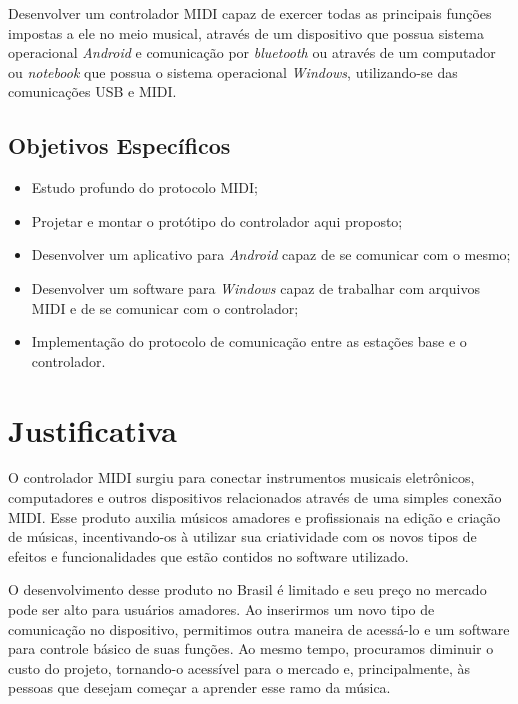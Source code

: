             Desenvolver um controlador MIDI capaz de exercer todas as principais funções impostas a ele no meio musical, através de um dispositivo que possua sistema operacional \textit{Android} e comunicação por \textit{bluetooth} ou através de um computador ou \textit{notebook} que possua o sistema operacional \textit{Windows}, utilizando-se das comunicações USB e MIDI.

        \subsection{Objetivos Específicos}

            \begin{itemize}
              \item Estudo profundo do protocolo MIDI;

              \item Projetar e montar o protótipo do controlador aqui proposto;

              \item Desenvolver um aplicativo para \textit{Android} capaz de se comunicar com o mesmo;

              \item Desenvolver um software para \textit{Windows} capaz de trabalhar com arquivos MIDI e de se comunicar com o controlador;

              \item Implementação do protocolo de comunicação entre as estações base e o controlador.
            \end{itemize}

    \section{Justificativa}

        O controlador MIDI surgiu para conectar instrumentos musicais eletrônicos, computadores e outros dispositivos relacionados através de uma simples conexão MIDI. Esse produto auxilia músicos amadores e profissionais na edição e criação de músicas, incentivando-os à utilizar sua criatividade com os novos tipos de efeitos e funcionalidades que estão contidos no software utilizado.

        O desenvolvimento desse produto no Brasil é limitado e seu preço no mercado pode ser alto para usuários amadores. Ao inserirmos um novo tipo de comunicação no dispositivo, permitimos outra maneira de acessá-lo e um software para controle básico de suas funções. Ao mesmo tempo, procuramos diminuir o custo do projeto, tornando-o acessível para o mercado e, principalmente, às pessoas que desejam começar a aprender esse ramo da música.

